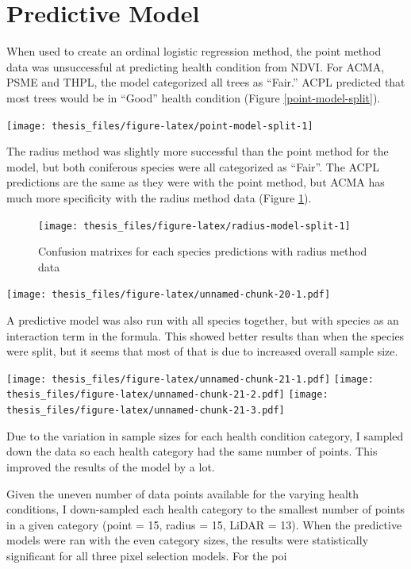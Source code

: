 \documentclass[12pt,twoside]{reedthesis}
\begin{document}
\hypertarget{predictive-model}{%
\section{Predictive Model}\label{predictive-model}}

When used to create an ordinal logistic regression method, the point method data was unsuccessful at predicting health condition from NDVI. For ACMA, PSME and THPL, the model categorized all trees as ``Fair.'' ACPL predicted that most trees would be in ``Good'' health condition (Figure \ref{point-model-split}).

\texttt{[image: thesis\_files/figure-latex/point-model-split-1]}

The radius method was slightly more successful than the point method for the model, but both coniferous species were all categorized as ``Fair''. The ACPL predictions are the same as they were with the point method, but ACMA has much more specificity with the radius method data (Figure \ref{fig:radius-model-split}).
\begin{figure}
\texttt{[image: thesis\_files/figure-latex/radius-model-split-1]} \caption[Confusion matrixes for Radius data model]{Confusion matrixes for each species predictions with radius method data}\label{fig:radius-model-split}
\end{figure}
\texttt{[image: thesis\_files/figure-latex/unnamed-chunk-20-1.pdf]}

A predictive model was also run with all species together, but with species as an interaction term in the formula. This showed better results than when the species were split, but it seems that most of that is due to increased overall sample size.

\texttt{[image: thesis\_files/figure-latex/unnamed-chunk-21-1.pdf]} \texttt{[image: thesis\_files/figure-latex/unnamed-chunk-21-2.pdf]} \texttt{[image: thesis\_files/figure-latex/unnamed-chunk-21-3.pdf]}

Due to the variation in sample sizes for each health condition category, I sampled down the data so each health category had the same number of points. This improved the results of the model by a lot.

Given the uneven number of data points available for the varying health conditions, I down-sampled each health category to the smallest number of points in a given category (point = 15, radius = 15, LiDAR = 13). When the predictive models were ran with the even category sizes, the results were statistically significant for all three pixel selection models. For the poi
\end{document}
